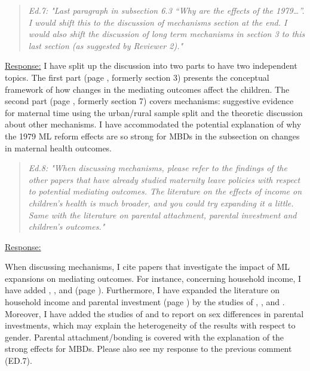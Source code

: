 \bigskip
{}
\begin{quote}
	\textit{Ed.7: "Last paragraph in subsection 6.3 “Why are the effects of the 1979…”. I would shift this to the discussion of mechanisms section at the end. I would also shift the discussion of long term mechanisms in section 3 to this last section (as suggested by Reviewer 2)."}
\end{quote}
\underline{Response:} I have split up the discussion into two parts to have two independent topics. The first part (page \pageref{rev_mlch: restructure_discussion_framework}, formerly section 3) presents the conceptual framework of how changes in the mediating outcomes affect the children. The second part (page \pageref{ref_mlch: discussion_mechanisms}, formerly section 7) covers mechanisms: suggestive evidence for maternal time using the urban/rural sample split and the theoretic discussion about other mechanisms. I have accommodated the potential explanation of why the 1979 ML reform effects are so strong for MBDs in the subsection on changes in maternal health outcomes.


\bigskip
{}
\begin{quote}
	\textit{Ed.8: "When discussing mechanisms, please refer to the findings of the other papers that have already studied maternity leave policies with respect to potential mediating outcomes. The literature on the effects of income on children’s health is much broader, and you could try expanding it a little. Same with the literature on parental attachment, parental investment and children’s outcomes."}
\end{quote}
\underline{Response:} 

When discussing mechanisms, I cite papers that investigate the impact of ML expansions on mediating outcomes. For instance, concerning household income, I have added \cite{carneiro2015flying}, \cite{Dahl2016Case}, and \cite{butikofer2018impact} (page \pageref{rev_mlch: r2_maternal_income_missing_link}). Furthermore, I have expanded the literature on household income and parental investment (page \pageref{rev_mlch: ed_literature_income_childhealth}) by the studies of \cite{milligan2011taxbenefits}, \cite{aizer2016cash-transfer}, and \cite{akee2018income}. Moreover, I have added the studies of \cite{baker2016} and \cite{bharadwaj2013discrimination} to report on sex differences in parental investments, which may explain the heterogeneity of the results with respect to gender. Parental attachment/bonding is covered with the explanation of the strong effects for MBDs. Please also see my response to the previous comment (ED.7).

